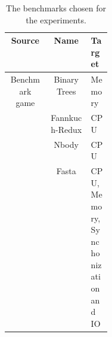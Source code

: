 \begin{table}[ht]
    \centering
    \begin{tabular}{||c | c | p{0.2\linewidth}||}
    \hline
    \textbf{Source} & \textbf{Name} & \textbf{Target} \\[0.5ex] \hline\hline
    Benchmark game & Binary Trees & Memory \\
    & Fannkuch-Redux & CPU \\
    & Nbody & CPU \\
    & Fasta & CPU, Memory, Synchonization and IO \\
    \hline
    \end{tabular}
    \caption{The benchmarks chosen for the experiments.}
    \label{tab:benchmarks}
\end{table}
